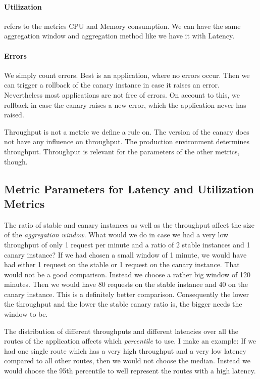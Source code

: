 \paragraph{Utilization} refers to the metrics CPU and Memory consumption. We can have the
same aggregation window and aggregation method like we have it with Latency.

\paragraph{Errors} We simply count errors. Best is an application, where no errors
occur. Then we can trigger a rollback of the canary instance in case it raises an
error. Nevertheless most applications are not free of errors. On account to this, we
rollback in case the canary raises a new error, which the application never has raised.

Throughput is not a metric we define a rule on. The version of the canary does not have
any influence on throughput. The production environment determines throughput. Throughput
is relevant for the parameters of the other metrics, though.

\subsection{Metric Parameters for Latency and Utilization Metrics}

The ratio of stable and canary instances as well as the throughput affect the size of the
\emph{aggregation window}. What would we do in case we had a very low throughput of only 1
request per minute and a ratio of 2 stable instances and 1 canary instance? If we had
chosen a small window of 1 minute, we would have had either 1 request on the stable or 1
request on the canary instance. That would not be a good comparison. Instead we choose a
rather big window of 120 minutes. Then we would have 80 requests on the stable instance
and 40 on the canary instance. This is a definitely better comparison. Consequently the
lower the throughput and the lower the stable canary ratio is, the bigger needs the window
to be.

The distribution of different throughputs and different latencies over all the routes of
the application affects which \emph{percentile} to use. I make an example: If we had one
single route which has a very high throughput and a very low latency compared to all other
routes, then we would not choose the median. Instead we would choose the 95th percentile
to well represent the routes with a high latency.


